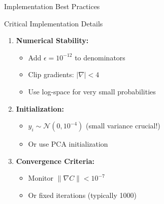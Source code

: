 \begin{frame}{Implementation Best Practices}
\begin{block}{Critical Implementation Details}
\begin{enumerate}
\item \textbf{Numerical Stability:}
    \begin{itemize}
    \item Add $\epsilon = 10^{-12}$ to denominators
    \item Clip gradients: $|\nabla| < 4$
    \item Use log-space for very small probabilities
    \end{itemize}
    
\item \textbf{Initialization:}
    \begin{itemize}
    \item $y_i \sim \mathcal{N}(0, 10^{-4})$ (small variance crucial!)
    \item Or use PCA initialization
    \end{itemize}
    
\item \textbf{Convergence Criteria:}
    \begin{itemize}
    \item Monitor $\|\nabla C\| < 10^{-7}$
    \item Or fixed iterations (typically 1000)
    \end{itemize}
\end{enumerate}
\end{block}

\end{frame}


